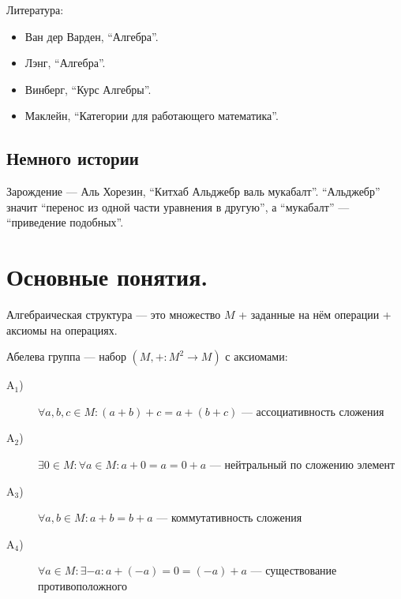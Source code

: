 \documentclass[12pt,a4paper]{article}
\date{}
\newcommand{\A}{\ensuremath{\mathrm{A}}\xspace}
\begin{document}
    \maketitle

    \listoftodos[TODOs]

    \tableofcontents

    \vspace{2em}

    Литература:
    \begin{itemize}
        \item Ван дер Варден, ``Алгебра''.
        \item Лэнг, ``Алгебра''.
        \item Винберг, ``Курс Алгебры''.
        \item Маклейн, ``Категории для работающего математика''.
    \end{itemize}

    \subsection*{Немного истории}

    Зарождение --- Аль Хорезин, ``Китхаб Альджебр валь мукабалт''. ``Альджебр'' значит ``перенос из одной части уравнения в другую'', а ``мукабалт'' --- ``приведение подобных''.

    \section{Основные понятия.}

    \begin{definition}
        Алгебраическая структура --- это множество $M$ + заданные на нём операции + аксиомы на операциях.
    \end{definition}

    \begin{definition}
        Абелева группа --- набор $(M, +: M^2 \to M)$ с аксиомами:
        \begin{description}
            \item[$\A_1$)] $\forall a, b, c \in M: (a + b) + c = a + (b + c)$ --- ассоциативность сложения
            \item[$\A_2$)] $\exists 0 \in M: \forall a \in M: a + 0 = a = 0 + a$ --- нейтральный по сложению элемент
            \item[$\A_3$)] $\forall a, b \in M: a + b = b + a$ --- коммутативность сложения
            \item[$\A_4$)] $\forall a \in M: \exists -a: a + (-a) = 0 = (-a) + a$ --- существование противоположного
        \end{description}
    \end{definition}
\end{document}
